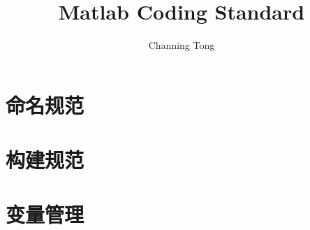 \documentclass[UTF8]{ctexart}
\title{Matlab Coding Standard}
\author{Channing Tong}
\begin{document}
\maketitle

\tableofcontents

\section{命名规范}

\section{构建规范}

\section{变量管理}


\end{document}
